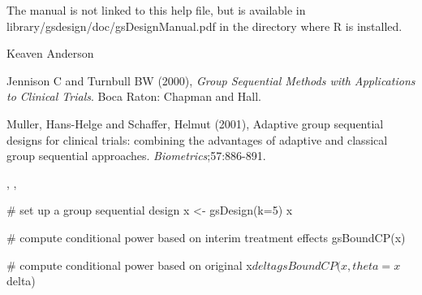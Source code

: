 \begin{Note}\relax
The manual is not linked to this help file, but is available in library/gsdesign/doc/gsDesignManual.pdf
in the directory where R is installed.
\end{Note}
\begin{Author}\relax
Keaven Anderson 
\end{Author}
\begin{References}\relax
Jennison C and Turnbull BW (2000), \emph{Group Sequential Methods with Applications to Clinical Trials}.
Boca Raton: Chapman and Hall.

Muller, Hans-Helge and Schaffer, Helmut (2001), Adaptive group sequential designs for clinical trials:
combining the advantages of adaptive and classical group sequential approaches. \emph{Biometrics};57:886-891.
\end{References}
\begin{SeeAlso}\relax
{}, , 
\end{SeeAlso}
\begin{Examples}
\begin{ExampleCode}
# set up a group sequential design
x <- gsDesign(k=5)
x

# compute conditional power based on interim treatment effects
gsBoundCP(x)

# compute conditional power based on original x$delta
gsBoundCP(x, theta=x$delta)
\end{ExampleCode}
\end{Examples}

